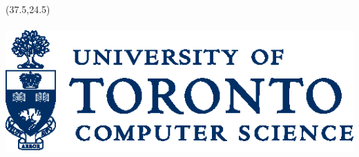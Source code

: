 \documentclass{article}
\begin{document}
\begin{textblock}{8}(37.5,24.5)
\begin{center}
\includegraphics[height=5cm]{dcs_logo.eps}
\end{center}
\end{textblock}









\end{document}
